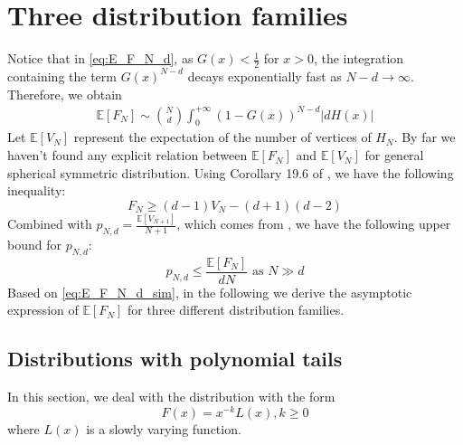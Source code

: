 \documentclass{aptpub}
\def\E{\mathbb{E}}
\begin{document}
\section{Three distribution families}\label{sec:three_distriutions}
Notice that in \eqref{eq:E_F_N_d}, as $G(x)<\frac{1}{2}$ for $x>0$, the integration containing the
term $G(x)^{N-d}$ decays exponentially fast as $N-d\to \infty$.
Therefore, we obtain
\begin{align}
     \E[F_N] \sim \binom{N}{d} \int_0^{+\infty} 
      (1-G(x))^{N-d} |dH(x)| 
     \label{eq:E_F_N_d_sim}
\end{align}
Let $\E[V_N]$ represent the expectation of the number of
vertices of $H_N$.
By far we haven't found any explicit relation between $\E[F_N]$ and $\E[V_N]$
for general spherical symmetric distribution.
Using Corollary 19.6 of \cite{brondsted2012introduction}, we have the following
inequality:
\begin{equation}\label{eq:F_V_upper}
     F_N \geq (d-1) V_N - (d+1)(d-2)
 \end{equation}
Combined with $p_{N,d} = \frac{\E[V_{N+1}]}{N+1}$, which comes from
\cite{efron1965convex}, we have the following upper bound for $p_{N,d}$:
\begin{equation}
    p_{N,d} \leq \frac{\E[F_N]}{d N} \textrm{ as } N \gg d
\end{equation}
Based on \eqref{eq:E_F_N_d_sim}, in the following
we derive the asymptotic expression of $\E[F_N]$
for three different distribution families.
\subsection{Distributions with polynomial tails}
In this section, we deal with the distribution with the form
\begin{equation}\label{eq:F_poly_tail}
     F(x) = x^{-k} L(x), k\geq 0
\end{equation}
where $L(x)$ is a slowly varying function.
\end{document}
